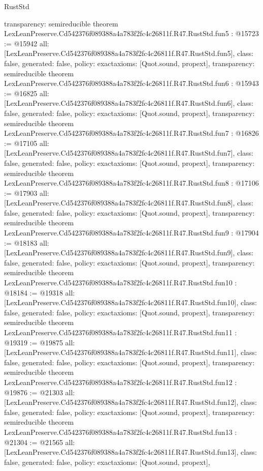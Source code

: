 \begin{lexlean}{RustStd}
\begin{coremodule}
{  transparency: semireducible
}
theorem LexLeanPreserve.Cd542376f089388a4a783f2fc4c26811f.R47.RustStd.fun5 : @15723 := @15942 {
  all: [LexLeanPreserve.Cd542376f089388a4a783f2fc4c26811f.R47.RustStd.fun5],
  class: false,
  generated: false,
  policy: exact{axioms: [Quot.sound, propext]},
  transparency: semireducible
}
theorem LexLeanPreserve.Cd542376f089388a4a783f2fc4c26811f.R47.RustStd.fun6 : @15943 := @16825 {
  all: [LexLeanPreserve.Cd542376f089388a4a783f2fc4c26811f.R47.RustStd.fun6],
  class: false,
  generated: false,
  policy: exact{axioms: [Quot.sound, propext]},
  transparency: semireducible
}
theorem LexLeanPreserve.Cd542376f089388a4a783f2fc4c26811f.R47.RustStd.fun7 : @16826 := @17105 {
  all: [LexLeanPreserve.Cd542376f089388a4a783f2fc4c26811f.R47.RustStd.fun7],
  class: false,
  generated: false,
  policy: exact{axioms: [Quot.sound, propext]},
  transparency: semireducible
}
theorem LexLeanPreserve.Cd542376f089388a4a783f2fc4c26811f.R47.RustStd.fun8 : @17106 := @17903 {
  all: [LexLeanPreserve.Cd542376f089388a4a783f2fc4c26811f.R47.RustStd.fun8],
  class: false,
  generated: false,
  policy: exact{axioms: [Quot.sound, propext]},
  transparency: semireducible
}
theorem LexLeanPreserve.Cd542376f089388a4a783f2fc4c26811f.R47.RustStd.fun9 : @17904 := @18183 {
  all: [LexLeanPreserve.Cd542376f089388a4a783f2fc4c26811f.R47.RustStd.fun9],
  class: false,
  generated: false,
  policy: exact{axioms: [Quot.sound, propext]},
  transparency: semireducible
}
theorem LexLeanPreserve.Cd542376f089388a4a783f2fc4c26811f.R47.RustStd.fun10 : @18184 := @19318 {
  all: [LexLeanPreserve.Cd542376f089388a4a783f2fc4c26811f.R47.RustStd.fun10],
  class: false,
  generated: false,
  policy: exact{axioms: [Quot.sound, propext]},
  transparency: semireducible
}
theorem LexLeanPreserve.Cd542376f089388a4a783f2fc4c26811f.R47.RustStd.fun11 : @19319 := @19875 {
  all: [LexLeanPreserve.Cd542376f089388a4a783f2fc4c26811f.R47.RustStd.fun11],
  class: false,
  generated: false,
  policy: exact{axioms: [Quot.sound, propext]},
  transparency: semireducible
}
theorem LexLeanPreserve.Cd542376f089388a4a783f2fc4c26811f.R47.RustStd.fun12 : @19876 := @21303 {
  all: [LexLeanPreserve.Cd542376f089388a4a783f2fc4c26811f.R47.RustStd.fun12],
  class: false,
  generated: false,
  policy: exact{axioms: [Quot.sound, propext]},
  transparency: semireducible
}
theorem LexLeanPreserve.Cd542376f089388a4a783f2fc4c26811f.R47.RustStd.fun13 : @21304 := @21565 {
  all: [LexLeanPreserve.Cd542376f089388a4a783f2fc4c26811f.R47.RustStd.fun13],
  class: false,
  generated: false,
  policy: exact{axioms: [Quot.sound, propext]},
}
\end{coremodule}
\end{lexlean}

